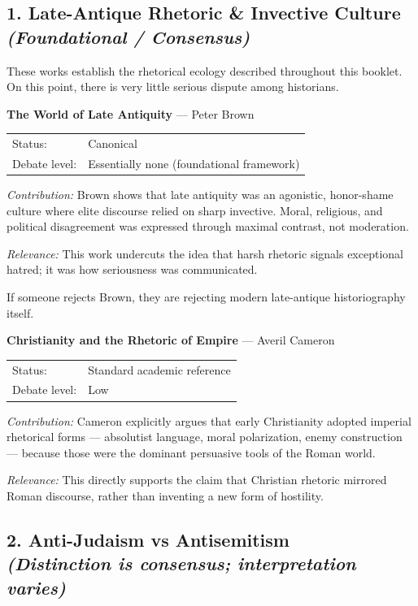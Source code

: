 \documentclass[10pt,twoside,openany]{book}
\begin{document}
\subsection{\texorpdfstring{1. Late-Antique Rhetoric \& Invective Culture\\{\normalfont\small\itshape (Foundational / Consensus)}}{1. Late-Antique Rhetoric \& Invective Culture (Foundational / Consensus)}}

These works establish the rhetorical ecology described throughout this
booklet. On this point, there is very little serious dispute among
historians.

\medskip

\textbf{The World of Late Antiquity} --- Peter Brown

\begin{tabular}{@{}ll@{}}
Status: & Canonical \\
Debate level: & Essentially none (foundational framework)
\end{tabular}

\emph{Contribution:}
Brown shows that late antiquity was an agonistic, honor-shame culture
where elite discourse relied on sharp invective. Moral, religious,
and political disagreement was expressed through maximal contrast,
not moderation.

\emph{Relevance:}
This work undercuts the idea that harsh rhetoric signals exceptional
hatred; it was how seriousness was communicated.

If someone rejects Brown, they are rejecting modern late-antique
historiography itself.

\medskip

\textbf{Christianity and the Rhetoric of Empire} --- Averil Cameron

\begin{tabular}{@{}ll@{}}
Status: & Standard academic reference \\
Debate level: & Low
\end{tabular}

\emph{Contribution:}
Cameron explicitly argues that early Christianity adopted imperial
rhetorical forms --- absolutist language, moral polarization, enemy
construction --- because those were the dominant persuasive tools of
the Roman world.

\emph{Relevance:}
This directly supports the claim that Christian rhetoric mirrored
Roman discourse, rather than inventing a new form of hostility.

\subsection{\texorpdfstring{2. Anti-Judaism vs Antisemitism\\{\normalfont\small\itshape (Distinction is consensus; interpretation varies)}}{2. Anti-Judaism vs Antisemitism (Distinction is consensus; interpretation varies)}}
\end{document}
